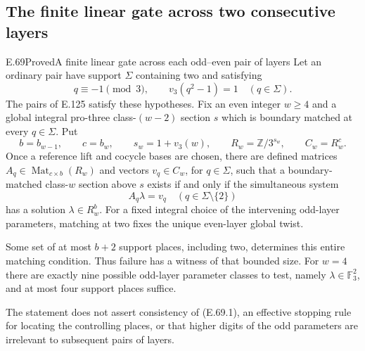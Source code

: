 \newpage
\subsection{The finite linear gate across two consecutive layers}

\begin{result}{E.69}{Proved}{A finite linear gate across each odd--even pair of layers}
\label{coh:two-step-finite-gate}
Let an ordinary pair have support $\Sigma$ containing two
and satisfying
\[
 q\equiv-1\pmod3,\qquad v_3(q^2-1)=1
                       \quad(q\in\Sigma).
\]
The pairs of E.125 satisfy these hypotheses.
Fix an even integer $w\geq4$ and a global integral
pro-three class-$(w-2)$ section $s$ which is
boundary matched at every $q\in\Sigma$.
Put
\[
 b=b_{w-1},\qquad c=b_w,\qquad
 s_w=1+v_3(w),\qquad R_w=\mathbb Z/3^{s_w},
 \qquad C_w=R_w^c .
\]
Once a reference lift and cocycle bases are chosen,
there are defined matrices
$A_q\in\operatorname{Mat}_{c\times b}(R_w)$
and vectors $v_q\in C_w$, for $q\in\Sigma$, such
that a boundary-matched class-$w$ section above
$s$ exists if and only if the simultaneous system
\[
                         A_q\lambda=v_q
             \quad(q\in\Sigma\setminus\{2\})
 \tag{E.69.1}
\]
has a solution $\lambda\in R_w^b$.
For a fixed integral choice of the intervening
odd-layer parameters, matching at two fixes the
unique even-layer global twist.

Some set of at most $b+2$ support places, including
two, determines this entire matching condition.
Thus failure has a witness of that bounded size.
For $w=4$ there are exactly nine possible
odd-layer parameter classes to test, namely
$\lambda\in\mathbb F_3^2$, and at most four
support places suffice.

The statement does not assert consistency of
(E.69.1), an effective stopping rule for locating
the controlling places, or that higher digits
of the odd parameters are irrelevant to subsequent
pairs of layers.
\end{result}
